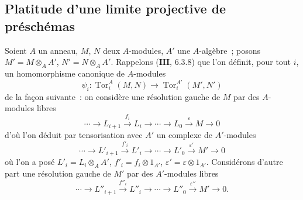 \subsection{Platitude d'une limite projective de préschémas}
\label{subsection:IV.11.2-fr}

\begin{env}[11.2.1]
\label{IV.11.2.1-fr}
Soient $A$ un anneau, $M$, $N$ deux $A$-modules, $A'$ une $A$-algèbre~;
posons $M'=M\otimes_AA'$, $N'=N\otimes_AA'$. Rappelons
($\mathbf{III}$, 6.3.8) que l'on définit, pour tout $i$, un homomorphisme
canonique de $A$-modules
\begin{equation}
\psi_i:\operatorname{Tor}_i^A(M,N)\to\operatorname{Tor}_i^{A'}(M',N')
\label{IV.11.2.1.1-fr}
\tag{11.2.1.1}
\end{equation}
de la façon suivante~: on considère une résolution gauche de $M$ par des
$A$-modules libres
\begin{equation}
\cdots\longrightarrow L_{i+1}\xrightarrow{f_i}L_i\longrightarrow\cdots
\longrightarrow L_0\xrightarrow{\varepsilon}M\longrightarrow0
\label{IV.11.2.1.2-fr}
\tag{11.2.1.2}
\end{equation}
d'où l'on déduit par tensorisation avec $A'$ un complexe de $A'$-modules
\begin{equation}
\cdots\longrightarrow L'_{i+1}\xrightarrow{f'_i}L'_i\longrightarrow\cdots
\longrightarrow L'_0\xrightarrow{\varepsilon'}M'\longrightarrow0
\label{IV.11.2.1.3-fr}
\tag{11.2.1.3}
\end{equation}
où l'on a posé $L'_i=L_i\otimes_AA'$, $f'_i=f_i\otimes1_{A'}$,
$\varepsilon'=\varepsilon\otimes1_{A'}$. Considérons d'autre part une
résolution gauche de $M'$ par des $A'$-modules libres
\begin{equation}
\cdots\longrightarrow L''_{i+1}\xrightarrow{f''_i}L''_i\longrightarrow\cdots
\longrightarrow L''_0\xrightarrow{\varepsilon''}M'\longrightarrow0.
\label{IV.11.2.1.4-fr}
\tag{11.2.1.4}
\end{equation}
\end{env}


